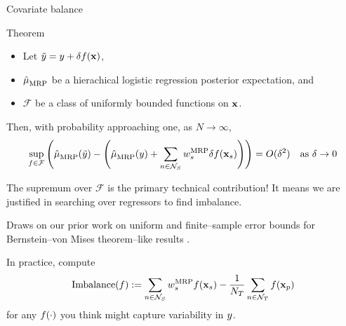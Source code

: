 \begin{frame}[t]{Covariate balance}

\begin{block}{Theorem}
    \begin{itemize}
        \item Let $\tilde{y} = y + \delta f(\mathbf{x})$,
        \item $\hat{\mu}^{}_{\mathrm{MRP}}$ be a hierachical logistic regression posterior expectation, and
        \item $\mathcal{F}$ be a class of uniformly bounded functions on $\mathbf{x}$.
    \end{itemize}
    Then, with probability approaching one, as $N \rightarrow \infty$,
    $$
    \begin{aligned}
        \sup_{f \in \mathcal{F}} \left(
            \hat{\mu}^{}_{\mathrm{MRP}}(\tilde{y}) -
            \left(\hat{\mu}^{}_{\mathrm{MRP}}(y) + \sum_{n \in \mathcal{N}_{S}} w_s^{\mathrm{MRP}} \delta f(\mathbf{x}_s) \right)
            \right)
        = O(\delta^2)
        \quad\textrm{as }\delta \rightarrow 0
    \end{aligned}
    $$
\end{block}

The supremum over $\mathcal{F}$ is the primary technical contribution!
It means we are justified in searching over regressors
to find imbalance.

Draws on our prior work on uniform and finite--sample error bounds for Bernstein--von Mises
theorem--like results \citep{giordano:2024:bayesij,kasprzak:2025:laplace}.

In practice, compute
$$
\textrm{Imbalance}(f) := \sum_{n \in \mathcal{N}_{S}} w_s^{\mathrm{MRP}} f(\mathbf{x}_s)  - \frac{1}{N_{T}} \sum_{n \in \mathcal{N}_{T}} f(\mathbf{x}_p)
$$
for any $f(\cdot)$ you think might capture variability in $y$.

\end{frame}





